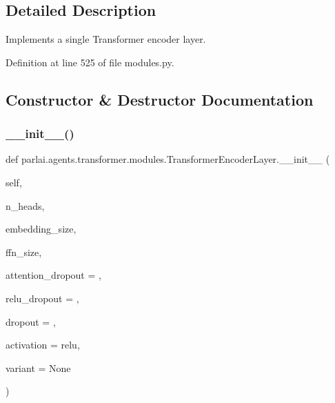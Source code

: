 \subsection{Detailed Description}
\begin{DoxyVerb}Implements a single Transformer encoder layer.\end{DoxyVerb}
 

Definition at line 525 of file modules.\+py.



\subsection{Constructor \& Destructor Documentation}
\mbox{\label{classparlai_1_1agents_1_1transformer_1_1modules_1_1TransformerEncoderLayer_a68caa3f119bfb946e34b7cf3c8bd9e48}} 
\subsubsection{\texorpdfstring{\+\_\+\+\_\+init\+\_\+\+\_\+()}{\_\_init\_\_()}}
{\footnotesize\ttfamily def parlai.\+agents.\+transformer.\+modules.\+Transformer\+Encoder\+Layer.\+\_\+\+\_\+init\+\_\+\+\_\+ (\begin{DoxyParamCaption}\item[{}]{self,  }\item[{}]{n\+\_\+heads,  }\item[{}]{embedding\+\_\+size,  }\item[{}]{ffn\+\_\+size,  }\item[{}]{attention\+\_\+dropout = {},  }\item[{}]{relu\+\_\+dropout = {},  }\item[{}]{dropout = {},  }\item[{}]{activation = {\ttfamily \textquotesingle{}relu\textquotesingle{}},  }\item[{}]{variant = {\ttfamily None} }\end{DoxyParamCaption})}



